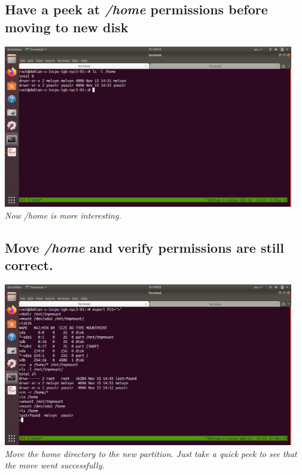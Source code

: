 \documentclass[10pt]{article}
\begin{document}
\subsection{Have a peek at \textit{/home} permissions before moving to new disk}
\begin{center}
    \includegraphics[width=0.95\textwidth]{Images/09_homePermissions.png}
	\textit{Now /home is more interesting.}
\end{center}

\subsection{Move \textit{/home} and verify permissions are still correct.}
\begin{center}
    \includegraphics[width=0.95\textwidth]{Images/10_successfullyMovedHome.png}
	\textit{Move the home directory to the new partition. Just take a quick peek
to see that the move went successfully.}
\end{center}
\end{document}
